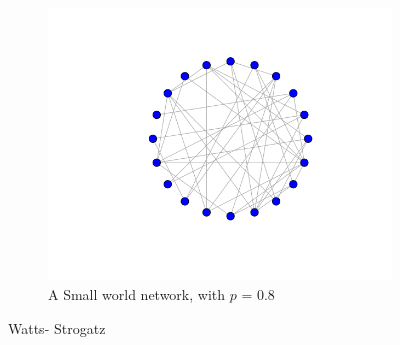 \begin{figure}[h]
\begin{subfigure}[b]{0.4\textwidth}
        \label{fig }
    \end{subfigure}
    ~ %
    \begin{subfigure}[b]{0.4\textwidth}
        \includegraphics[scale=0.4]{images/sw_p8.png} 
        \caption{A Small world network, with $p$ = 0.8}
        \label{fig }
    \end{subfigure}
    \caption{Watts- Strogatz}\label{fig networks}
\end{figure}

 
  
